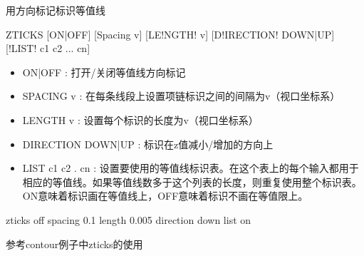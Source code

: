 \label{cmd:zticks}

用方向标记标识等值线

\begin{SACSTX}
ZTICKS [ON|OFF] [Spacing v] [LE!NGTH! v] [D!IRECTION! DOWN|UP] [!LIST! c1 c2 ... cn]
\end{SACSTX}

\begin{itemize}
\item ON|OFF : 打开/关闭等值线方向标记 
\item SPACING v : 在每条线段上设置项链标识之间的间隔为v（视口坐标系） 
\item LENGTH v : 设置每个标识的长度为v（视口坐标系） 
\item DIRECTION DOWN|UP : 标识在z值减小/增加的方向上 
\item LIST c1 c2 . cn : 设置要使用的等值线标识表。在这个表上的每个输入都用于相应的等值线。如果等值线数多于这个列表的长度，则重复使用整个标识表。ON意味着标识画在等值线上，OFF意味着标识不画在等值限上。 
\end{itemize}

\begin{SACDFT}
zticks off spacing 0.1 length 0.005 direction down list on
\end{SACDFT}

参考contour例子中zticks的使用

